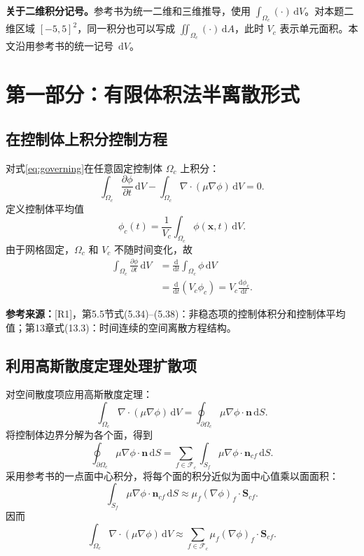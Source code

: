 \documentclass[UTF8,12pt,a4paper]{ctexart}
\numberwithin{equation}{section}
\newcommand{\Rone}{\textnormal{[R1]}}
\newcommand{\source}[1]{%
  \par\smallskip
  \noindent\colorbox{sourcebg}{%
    \parbox{0.955\linewidth}{\raggedright\footnotesize\color{sourcegray}\textbf{参考来源：}#1}%
  }
  \par\smallskip
}
\newcommand{\dd}{\,\mathrm d}
\newcommand{\Sf}{\bm S}
\newcommand{\xf}{\bm x}
\begin{document}
\noindent\textbf{关于二维积分记号。}参考书为统一二维和三维推导，使用 $\int_{\Omega_c}(\cdot)\dd V$。对本题二维区域 $[-5,5]^2$，同一积分也可以写成 $\iint_{\Omega_c}(\cdot)\dd A$，此时 $V_c$ 表示单元面积。本文沿用参考书的统一记号 $\dd V$。

\newpage
\section{第一部分：有限体积法半离散形式}

\subsection{在控制体上积分控制方程}

对式\eqref{eq:governing}在任意固定控制体 $\Omega_c$ 上积分：
\begin{equation}
  \int_{\Omega_c}\frac{\partial\phi}{\partial t}\dd V
  -\int_{\Omega_c}\nabla\cdot(\mu\nabla\phi)\dd V=0.
  \label{eq:cell_integrated}
\end{equation}
定义控制体平均值
\begin{equation}
  \phi_c(t)
  =\frac{1}{V_c}\int_{\Omega_c}\phi(\xf,t)\dd V.
  \label{eq:cell_average}
\end{equation}
由于网格固定，$\Omega_c$ 和 $V_c$ 不随时间变化，故
\begin{align}
  \int_{\Omega_c}\frac{\partial\phi}{\partial t}\dd V
  &=\frac{\mathrm d}{\mathrm dt}
    \int_{\Omega_c}\phi\dd V
    \label{eq:time_interchange}\\
  &=\frac{\mathrm d}{\mathrm dt}(V_c\phi_c)
   =V_c\frac{\mathrm d\phi_c}{\mathrm dt}.
  \label{eq:time_term_cell}
\end{align}

\source{\Rone，第5.5节式(5.34)--(5.38)：非稳态项的控制体积分和控制体平均值；第13章式(13.3)：时间连续的空间离散方程结构。}

\subsection{利用高斯散度定理处理扩散项}

对空间散度项应用高斯散度定理：
\begin{equation}
  \int_{\Omega_c}\nabla\cdot(\mu\nabla\phi)\dd V
  =\oint_{\partial\Omega_c}\mu\nabla\phi\cdot\bm n\dd S.
  \label{eq:gauss_theorem}
\end{equation}
将控制体边界分解为各个面，得到
\begin{equation}
  \oint_{\partial\Omega_c}\mu\nabla\phi\cdot\bm n\dd S
  =\sum_{f\in\mathcal F_c}
    \int_{S_f}\mu\nabla\phi\cdot\bm n_{cf}\dd S.
  \label{eq:boundary_face_sum}
\end{equation}
采用参考书的一点面中心积分，将每个面的积分近似为面中心值乘以面面积：
\begin{equation}
  \int_{S_f}\mu\nabla\phi\cdot\bm n_{cf}\dd S
  \approx
  \mu_f(\nabla\phi)_f\cdot\Sf_{cf}.
  \label{eq:face_midpoint}
\end{equation}
因而
\begin{equation}
  \int_{\Omega_c}\nabla\cdot(\mu\nabla\phi)\dd V
  \approx
  \sum_{f\in\mathcal F_c}
  \mu_f(\nabla\phi)_f\cdot\Sf_{cf}.
  \label{eq:diffusion_face_sum}
\end{equation}
\end{document}
